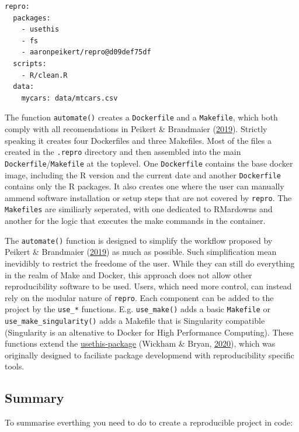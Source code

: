 \documentclass[12pt,a4paper,]{article}
\begin{document}
\begin{verbatim}
repro:
  packages:
    - usethis
    - fs
    - aaronpeikert/repro@d09def75df
  scripts:
    - R/clean.R
  data:
    mycars: data/mtcars.csv
\end{verbatim}

The function \texttt{automate()} creates a \texttt{Dockerfile} and a \texttt{Makefile}, which both comply with all recomendations in Peikert \& Brandmaier (\protect\hyperlink{ref-peikertReproducibleDataAnalysis2019}{2019}).
Strictly speaking it creates four Dockerfiles and three Makefiles.
Most of the files a created in the \texttt{.repro} directory and then assembled into the main \texttt{Dockerfile}/\texttt{Makefile} at the toplevel.
One \texttt{Dockerfile} contains the base docker image, including the R version and the current date and another \texttt{Dockerfile} contains only the R packages.
It also creates one where the user can manually ammend software installation or setup steps that are not covered by \texttt{repro}.
The \texttt{Makefiles} are similiarly seperated, with one dedicated to RMardowns and another for the logic that executes the make commands in the container.

The \texttt{automate()} function is designed to simplify the workflow proposed by Peikert \& Brandmaier (\protect\hyperlink{ref-peikertReproducibleDataAnalysis2019}{2019}) as much as possible.
Such simplification mean inevidibly to restrict the freedome of the user.
While they can still do everything in the realm of Make and Docker, this approach does not allow other reproducibility software to be used.
Users, which need more control, can instead rely on the modular nature of \texttt{repro}.
Each component can be added to the project by the \texttt{use\_*} functions.
E.g. \texttt{use\_make()} adds a basic \texttt{Makefile} or \texttt{use\_make\_singularity()} adds a Makefile that is Singularity compatible (Singularity is an altenative to Docker for High Performance Computing).
These functions extend the \href{https://usethis.r-lib.org}{usethis-package} (Wickham \& Bryan, \protect\hyperlink{ref-R-usethis}{2020}), which was originally designed to faciliate package developmend with reproducibility specific tools.

\hypertarget{summary}{%
\subsection{Summary}\label{summary}}

To summarise everthing you need to do to create a reproducible project in code:
\end{document}

